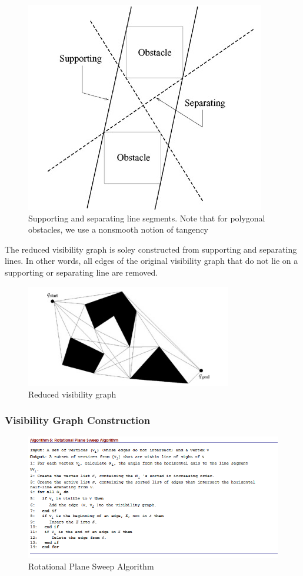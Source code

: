 \documentclass[11pt]{article}
\begin{document}
\begin{figure}[h]
  \centering
  \includegraphics{imgs/Supporting_separating_line_segments.png}
  \caption{Supporting and separating line segments. Note that for polygonal obstacles, we use a nonsmooth notion of tangency}
\end{figure}

The reduced visibility graph is soley constructed from supporting and separating lines. In other words, all edges of the original visibility graph that do not lie on a supporting or separating line are removed. \\

\begin{figure}[h]
  \centering
  \includegraphics[width=9cm]{imgs/R_V_G.png}
  \caption{Reduced visibility graph}
\end{figure}

\subsubsection{Visibility Graph Construction}
\begin{figure}[h]
  \centering
  \includegraphics{imgs/Algorithm_5.png}
  \caption{Rotational Plane Sweep Algorithm }
  \label{fig:Algorithm_5}
\end{figure}
\end{document}
